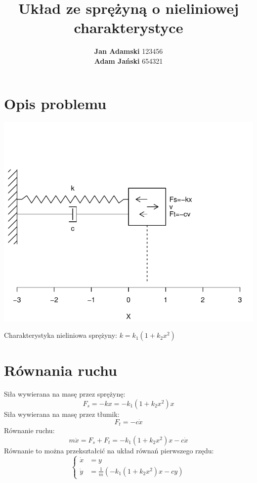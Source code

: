 \documentclass[12pt]{sprawozdanie}
\title{Układ ze sprężyną o nieliniowej charakterystyce}
\author{\textbf{Jan Adamski} 123456\\\textbf{Adam Jański} 654321}
\begin{document}
\maketitle
\hypertarget{opis-problemu}{%
\section{Opis problemu}\label{opis-problemu}}

\begin{center}\includegraphics{info2_files/figure-latex/scheme-1} \end{center}

Charakterystyka nieliniowa sprężyny: \(k=k_1(1+k_2x^2)\)

\hypertarget{rownania-ruchu}{%
\section{Równania ruchu}\label{rownania-ruchu}}

Siła wywierana na masę przez sprężynę: \[F_s = -kx = -k_1(1+k_2x^2)x\]
Siła wywierana na masę przez tłumik: \[F_t = -c\dot x\] Równanie ruchu:
\[m\ddot x = F_s + F_t = -k_1(1+k_2x^2)x-c\dot x\] Równanie to można
przekształcić na układ równań pierwszego rzędu:
\begin{equation}\label{uklad}\begin{cases}
\dot x &= y\\
\dot y &= \frac{1}{m}\left(-k_1(1+k_2x^2)x - cy\right)
\end{cases}\end{equation}
\end{document}
